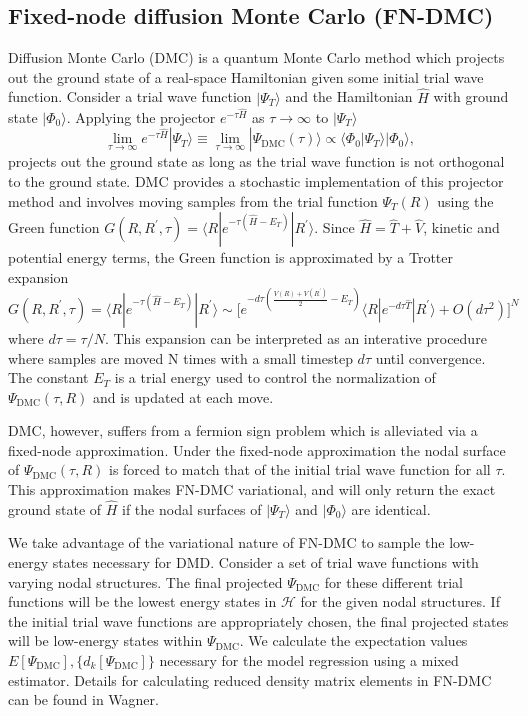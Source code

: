 \documentclass[12pt]{article}
\begin{document}
\subsection{Fixed-node diffusion Monte Carlo (FN-DMC)}
Diffusion Monte Carlo (DMC) is a quantum Monte Carlo method which projects out the ground state of a real-space Hamiltonian given some initial trial wave function.
Consider a trial wave function $|\Psi_T\rangle$ and the Hamiltonian $\hat{H}$ with ground state $|\Phi_0\rangle$. 
Applying the projector $e^{-\tau \hat{H}}$ as $\tau \rightarrow \infty$ to $|\Psi_T \rangle$
\begin{equation}
\lim_{\tau \rightarrow \infty} e^{-\tau \hat{H}} |\Psi_T\rangle 
\equiv \lim_{\tau \rightarrow \infty} |\Psi_\text{DMC}(\tau)\rangle \propto \langle \Phi_0|\Psi_T\rangle |\Phi_0\rangle,
\end{equation}
projects out the ground state as long as the trial wave function is not orthogonal to the ground state. 
DMC provides a stochastic implementation of this projector method and involves moving samples from the trial function $\Psi_T(R)$ using the Green function $G(R, R^\prime, \tau) = \langle R | e^{-\tau(\hat{H} - E_T)} | R^\prime \rangle$. 
Since $\hat{H} = \hat{T} + \hat{V}$, kinetic and potential energy terms, the Green function is approximated by a Trotter expansion $G(R, R^\prime, \tau) = \langle R | e^{-\tau(\hat{H} - E_T)} | R^\prime \rangle \sim \Big[e^{-d\tau(\frac{V(R) + V(R^\prime)}{2} - E_T)} \langle R| e^{-d\tau\hat{T}}|R^\prime \rangle + O(d\tau^2) \Big]^N $ where $d\tau = \tau/N$.
This expansion can be interpreted as an interative procedure where samples are moved N times with a small timestep $d\tau$ until convergence.
The constant $E_T$ is a trial energy used to control the normalization of $\Psi_\text{DMC}(\tau, R)$ and is updated at each move.

DMC, however, suffers from a fermion sign problem which is alleviated via a fixed-node approximation.
Under the fixed-node approximation the nodal surface of $\Psi_\text{DMC}(\tau, R)$ is forced to match that of the initial trial wave function for all $\tau$.
This approximation makes FN-DMC variational, and will only return the exact ground state of $\hat{H}$ if the nodal surfaces of $|\Psi_T\rangle$ and $|\Phi_0\rangle$ are identical.

We take advantage of the variational nature of FN-DMC to sample the low-energy states necessary for DMD.
Consider a set of trial wave functions with varying nodal structures.
The final projected $\Psi_\text{DMC}$ for these different trial functions will be the lowest energy states in $\mathcal{H}$ for the given nodal structures.
If the initial trial wave functions are appropriately chosen, the final projected states will be low-energy states within $\Psi_\text{DMC}$.
We calculate the expectation values $E[\Psi_\text{DMC}], \{d_k[\Psi_\text{DMC}]\}$ necessary for the model regression using a mixed estimator.
Details for calculating reduced density matrix elements in FN-DMC can be found in Wagner.
\end{document}
